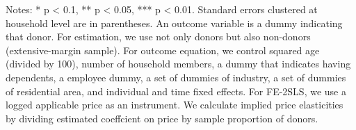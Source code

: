 \begin{table}
\begin{threeparttable}
\begin{tabular}[t]{l>{\centering\arraybackslash}p{6.25em}>{\centering\arraybackslash}p{6.25em}>{\centering\arraybackslash}p{6.25em}>{\centering\arraybackslash}p{6.25em}}
\bottomrule
\end{tabular}
\begin{tablenotes}
\item Notes: * p < 0.1, ** p < 0.05, *** p < 0.01. Standard errors clustered at household level are in parentheses. An outcome variable is a dummy indicating that donor. For estimation, we use not only donors but also non-donors (extensive-margin sample). For outcome equation, we control squared age (divided by 100), number of household members, a dummy that indicates having dependents, a employee dummy, a set of dummies of industry, a set of dummies of residential area, and individual and time fixed effects. For FE-2SLS, we use a logged applicable price as an instrument. We calculate implied price elasticities by dividing estimated coeffcient on price by sample proportion of donors.
\end{tablenotes}
\end{threeparttable}
\end{table}

